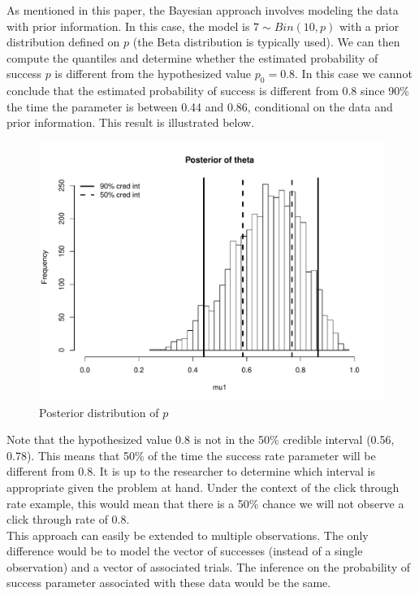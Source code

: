 \documentclass[12pt]{article}
\begin{document}
\noindent As mentioned in this paper, the Bayesian approach involves modeling the data with prior information. In this case, the model is $7 \sim Bin(10, p)$ with a prior distribution defined on $p$ (the Beta distribution is typically used). We can then compute the quantiles and determine whether the estimated probability of success $p$ is different from the hypothesized value $p_0 = 0.8$. In this case we cannot conclude that the estimated probability of success is different from 0.8 since 90\% the time the parameter is between 0.44 and 0.86, conditional on the data and prior information. This result is illustrated below. \\

\begin{figure}[H]\caption[]{Posterior distribution of $p$}
\centering
\begin{minipage}{0.6\linewidth}
\includegraphics[trim={0cm 0cm 0cm 1.5cm}, clip, scale=0.6]{../figs/bin1.pdf}
\end{minipage}
\end{figure}

\noindent Note that the hypothesized value 0.8 is not in the 50\% credible interval (0.56, 0.78). This means that 50\% of the time the success rate parameter will be different from 0.8. It is up to the researcher to determine which interval is appropriate given the problem at hand. Under the context of the click through rate example, this would mean that there is a 50\% chance we will not observe a click through rate of 0.8.\\

\noindent This approach can easily be extended to multiple observations. The only difference would be to model the vector of successes (instead of a single observation) and a vector of associated trials. The inference on the probability of success parameter associated with these data would be the same. \\
\end{document}

